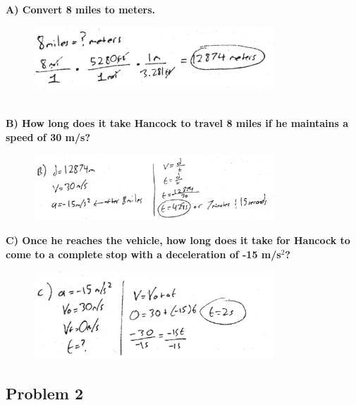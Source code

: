 \documentclass[a4paper,12pt]{article}
\begin{document}
\noindent\textbf{A) Convert 8 miles to meters.} \\


\begin{figure}[H]
    \centering
    \includegraphics[width=0.8\textwidth]{U1_P1_A} %
\end{figure} \\

\newpage
\noindent\textbf{B) How long does it take Hancock to travel 8 miles if he maintains a speed of 30 m/s?} \\


\begin{figure}[H]
    \centering
    \includegraphics[width=0.8\textwidth]{U1_P1_B} %
\end{figure}


\noindent\textbf{C) Once he reaches the vehicle, how long does it take for Hancock to come to a complete stop with a deceleration of -15 m/s$^2$?} \\


\begin{figure}[H]
    \centering
    \includegraphics[width=0.8\textwidth]{U1_P1_C} %
\end{figure}


\newpage
\subsection{Problem 2}
\end{document}
